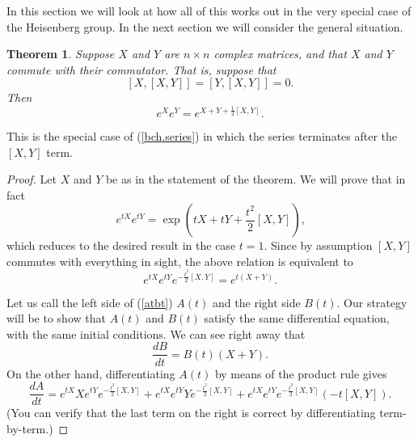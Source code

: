\documentclass{amsbook}
\theoremstyle{plain}
\newtheorem{theorem}{Theorem}
\numberwithin{equation}{chapter}
\numberwithin{theorem}{chapter}
\begin{document}
In this section we will look at how all of this works out in the very special
case of the Heisenberg group. In the next section we will consider the general situation.

\begin{theorem}
\label{bch.heisenberg}Suppose $X$ and $Y$ are $n\times n$ complex matrices,
and that $X$ and $Y$ commute with their commutator. That is, suppose that
\[
\left[  X,\left[  X,Y\right]  \right]  =\left[  Y,\left[  X,Y\right]  \right]
=0\text{.}%
\]
Then
\[
e^{X}e^{Y}=e^{X+Y+\frac{1}{2}\left[  X,Y\right]  }\text{.}%
\]
\end{theorem}

This is the special case of (\ref{bch.series}) in which the series terminates
after the $\left[  X,Y\right]  $ term.

\begin{proof}
Let $X$ and $Y$ be as in the statement of the theorem. We will prove that in
fact
\[
e^{tX}e^{tY}=\exp\left(  tX+tY+\frac{t^{2}}{2}\left[  X,Y\right]  \right)
\text{,}%
\]
which reduces to the desired result in the case $t=1$. Since by assumption
$\left[  X,Y\right]  $ commutes with everything in sight, the above relation
is equivalent to
\begin{equation}
e^{tX}e^{tY}e^{-\frac{t^{2}}{2}\left[  X,Y\right]  }=e^{t\left(  X+Y\right)
}\text{.}\label{atbt}%
\end{equation}

Let us call the left side of (\ref{atbt}) $A(t)$ and the right side $B\left(
t\right)  $. Our strategy will be to show that $A\left(  t\right)  $ and
$B\left(  t\right)  $ satisfy the same differential equation, with the same
initial conditions. We can see right away that
\[
\frac{dB}{dt}=B\left(  t\right)  \left(  X+Y\right)  \text{.}%
\]
On the other hand, differentiating $A\left(  t\right)  $ by means of the
product rule gives
\begin{equation}
\frac{dA}{dt}=e^{tX}Xe^{tY}e^{-\frac{t^{2}}{2}\left[  X,Y\right]  }%
+e^{tX}e^{tY}Ye^{-\frac{t^{2}}{2}\left[  X,Y\right]  }+e^{tX}e^{tY}%
e^{-\frac{t^{2}}{2}\left[  X,Y\right]  }\left(  -t\left[  X,Y\right]  \right)
\text{.}\label{part.deriv}%
\end{equation}
(You can verify that the last term on the right is correct by differentiating term-by-term.)


\end{proof}
\end{document}
